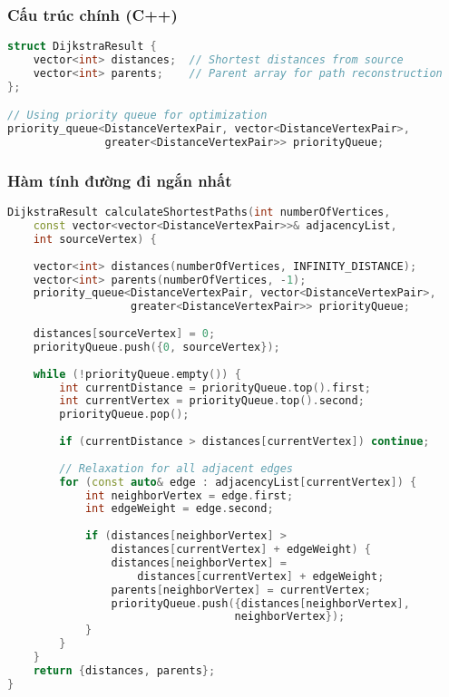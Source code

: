 \documentclass[12pt]{article}
\begin{document}
\subsubsection*{Cấu trúc chính (C++)}
\begin{lstlisting}[language=C++, basicstyle=\ttfamily\footnotesize, frame=single]
struct DijkstraResult {
    vector<int> distances;  // Shortest distances from source
    vector<int> parents;    // Parent array for path reconstruction
};

// Using priority queue for optimization
priority_queue<DistanceVertexPair, vector<DistanceVertexPair>, 
               greater<DistanceVertexPair>> priorityQueue;
\end{lstlisting}

\subsubsection*{Hàm tính đường đi ngắn nhất}
\begin{lstlisting}[language=C++, basicstyle=\ttfamily\footnotesize, frame=single]
DijkstraResult calculateShortestPaths(int numberOfVertices, 
    const vector<vector<DistanceVertexPair>>& adjacencyList, 
    int sourceVertex) {
    
    vector<int> distances(numberOfVertices, INFINITY_DISTANCE);
    vector<int> parents(numberOfVertices, -1);
    priority_queue<DistanceVertexPair, vector<DistanceVertexPair>, 
                   greater<DistanceVertexPair>> priorityQueue;
    
    distances[sourceVertex] = 0;
    priorityQueue.push({0, sourceVertex});
    
    while (!priorityQueue.empty()) {
        int currentDistance = priorityQueue.top().first;
        int currentVertex = priorityQueue.top().second;
        priorityQueue.pop();
        
        if (currentDistance > distances[currentVertex]) continue;
        
        // Relaxation for all adjacent edges
        for (const auto& edge : adjacencyList[currentVertex]) {
            int neighborVertex = edge.first;
            int edgeWeight = edge.second;
            
            if (distances[neighborVertex] > 
                distances[currentVertex] + edgeWeight) {
                distances[neighborVertex] = 
                    distances[currentVertex] + edgeWeight;
                parents[neighborVertex] = currentVertex;
                priorityQueue.push({distances[neighborVertex], 
                                   neighborVertex});
            }
        }
    }
    return {distances, parents};
}
\end{lstlisting}
\end{document}
